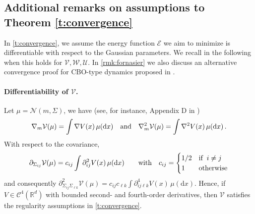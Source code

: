 \documentclass{article}
\theoremstyle{plain}
\theoremstyle{definition}
\theoremstyle{remark}
\newcommand{\E}{\mathcal{E}}
\begin{document}

\subsection{Additional remarks on assumptions to Theorem \ref{t:convergence}} \label{app:proofs:convergence}

In \cref{t:convergence}, we assume the energy function $\E$ we aim to minimize is differentiable with respect to the Gaussian parameters. We recall in the following when this holds for $\mathcal{V}, \mathcal{W}, \mathcal{U}$. In \cref{rmk:fornasier} we also discuss an alternative convergence proof for CBO-type dynamics proposed in \cite{fornasier2024consensusbased}.

\paragraph{Differentiability of $\mathcal{V}$.}
Let $\mu = \mathcal{N}(m, \Sigma)$, we have (see, for instance,  Appendix D in \cite{khan2023bayesian}) 
\[\nabla_{m} \mathcal{V}(\mu) = \int \nabla V(x)\,\mu(\mathrm{d}x)\quad \textup{and} \quad \nabla^2_{m} \mathcal{V}(\mu) = \int \nabla^2 V(x)\,\mu(\mathrm{d}x)\,.\] 
With respect to the covariance, \[\partial_{\Sigma_{ij}} \mathcal{V}(\mu) = c_{ij} \int \partial^2_{ij} V(x)\,\mu(\mathrm{d}x)\qquad \textup{with}\quad c_{ij} = \begin{cases}
    1/2 & \textup{if} \;\; i \neq j \\
    1 & \textup{otherwise}
\end{cases}\] 
and consequently $\partial^2_{\Sigma_{ij}\Sigma_{\ell k}} \mathcal{V}(\mu) = c_{ij}c_{\ell k} \int \partial^4_{ij\ell k} V(x)\,\mu(\mathrm{d}x)$.  
Hence, if $V \in \mathcal{C}^4(\mathbb{R}^d)$ with bounded second- and fourth-order derivatives, then $\mathcal{V}$  satisfies the regularity assumptions in \cref{t:convergence}. 
\end{document}
